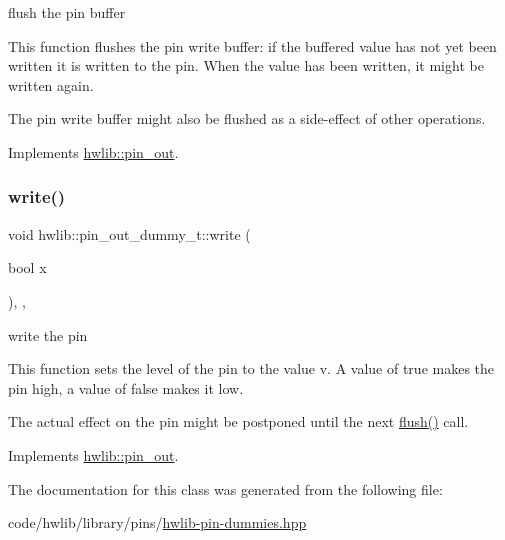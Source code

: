 flush the pin buffer

This function flushes the pin write buffer\+: if the buffered value has not yet been written it is written to the pin. When the value has been written, it might be written again.

The pin write buffer might also be flushed as a side-\/effect of other operations. 

Implements \hyperlink{classhwlib_1_1pin__out_ac22910317477a52431a44e7e3c66fc57}{hwlib\+::pin\+\_\+out}.

\mbox{\label{classhwlib_1_1pin__out__dummy__t_a155ff6021cfacdbed10f34ec1aef1630}} 
\subsubsection{\texorpdfstring{write()}{write()}}
{\footnotesize\ttfamily void hwlib\+::pin\+\_\+out\+\_\+dummy\+\_\+t\+::write (\begin{DoxyParamCaption}\item[{bool}]{x }\end{DoxyParamCaption})\hspace{0.3cm}{\ttfamily [inline]}, {\ttfamily [override]}, {\ttfamily [virtual]}}





write the pin

This function sets the level of the pin to the value v. A value of true makes the pin high, a value of false makes it low.

The actual effect on the pin might be postponed until the next \hyperlink{classhwlib_1_1pin__out__dummy__t_ac8513bd390f0315c544f8c2e299df3d6}{flush()} call. 

Implements \hyperlink{classhwlib_1_1pin__out_a8d260a70e503dcfb81987c408e170300}{hwlib\+::pin\+\_\+out}.



The documentation for this class was generated from the following file\+:\begin{DoxyCompactItemize}
\item 
code/hwlib/library/pins/\hyperlink{hwlib-pin-dummies_8hpp}{hwlib-\/pin-\/dummies.\+hpp}\end{DoxyCompactItemize}
